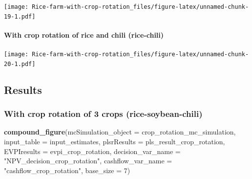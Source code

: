 \documentclass[
]{article}
\newenvironment{Shaded}{\begin{snugshade}}{\end{snugshade}}
\newcommand{\AttributeTok}[1]{\textcolor[rgb]{0.13,0.29,0.53}{#1}}
\newcommand{\DecValTok}[1]{\textcolor[rgb]{0.00,0.00,0.81}{#1}}
\newcommand{\FunctionTok}[1]{\textcolor[rgb]{0.13,0.29,0.53}{\textbf{#1}}}
\newcommand{\NormalTok}[1]{#1}
\newcommand{\OtherTok}[1]{\textcolor[rgb]{0.56,0.35,0.01}{#1}}
\newcommand{\SpecialCharTok}[1]{\textcolor[rgb]{0.81,0.36,0.00}{\textbf{#1}}}
\newcommand{\StringTok}[1]{\textcolor[rgb]{0.31,0.60,0.02}{#1}}
\begin{document}
\texttt{[image: Rice-farm-with-crop-rotation\_files/figure-latex/unnamed-chunk-19-1.pdf]}

\hypertarget{with-crop-rotation-of-rice-and-chili-rice-chili-1}{%
\paragraph{With crop rotation of rice and chili
(rice-chili)}\label{with-crop-rotation-of-rice-and-chili-rice-chili-1}}

\begin{Shaded}
\end{Shaded}

\texttt{[image: Rice-farm-with-crop-rotation\_files/figure-latex/unnamed-chunk-20-1.pdf]}

\hypertarget{results}{%
\subsection{Results}\label{results}}

\hypertarget{with-crop-rotation-of-3-crops-rice-soybean-chili-2}{%
\subsubsection{With crop rotation of 3 crops
(rice-soybean-chili)}\label{with-crop-rotation-of-3-crops-rice-soybean-chili-2}}

\begin{Shaded}
\begin{Highlighting}[]
\FunctionTok{compound\_figure}\NormalTok{(}\AttributeTok{mcSimulation\_object =}\NormalTok{ crop\_rotation\_mc\_simulation, }
                \AttributeTok{input\_table =}\NormalTok{ input\_estimates, }\AttributeTok{plsrResults =}\NormalTok{ pls\_result\_crop\_rotation, }
                \AttributeTok{EVPIresults =}\NormalTok{ evpi\_crop\_rotation, }\AttributeTok{decision\_var\_name =} \StringTok{"NPV\_decision\_crop\_rotation"}\NormalTok{, }
                \AttributeTok{cashflow\_var\_name =} \StringTok{"cashflow\_crop\_rotation"}\NormalTok{, }
                \AttributeTok{base\_size =} \DecValTok{7}\NormalTok{)}
\end{Highlighting}
\end{Shaded}
\end{document}
